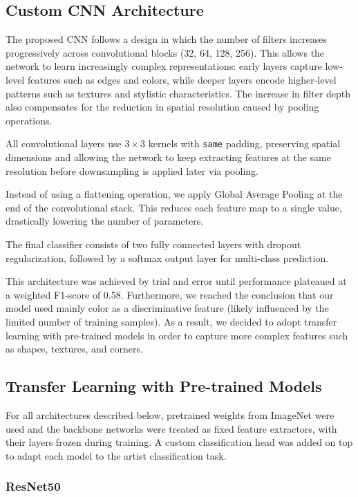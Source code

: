 \documentclass[12pt,a4paper]{article}
\begin{document}
\subsection{Custom CNN Architecture}

The proposed CNN follows a design in which the number of filters increases progressively across convolutional blocks (32, 64, 128, 256). 
This allows the network to learn increasingly complex representations: early layers capture low-level features such as edges and colors, while deeper layers encode higher-level patterns such as textures and stylistic characteristics.
The increase in filter depth also compensates for the reduction in spatial resolution caused by pooling operations.

All convolutional layers use $3 \times 3$ kernels with \texttt{same} padding, preserving spatial dimensions and allowing the network to keep extracting features at the same resolution before downsampling is applied later via pooling.

Instead of using a flattening operation, we apply Global Average Pooling at the end of the convolutional stack. 
This reduces each feature map to a single value, drastically lowering the number of parameters.

The final classifier consists of two fully connected layers with dropout regularization, followed by a softmax output layer for multi-class prediction.

This architecture was achieved by trial and error until performance plateaued at a weighted F1-score of 0.58. 
Furthermore, we reached the conclusion that our model used mainly color as a discriminative feature (likely influenced by the limited number of training samples).
As a result, we decided to adopt transfer learning with pre-trained models in order to capture more complex features such as shapes, textures, and corners. 


\subsection{Transfer Learning with Pre-trained Models}
For all architectures described below, pretrained weights from ImageNet were used and the backbone networks were treated as fixed feature extractors, with their layers frozen during training. 
A custom classification head was added on top to adapt each model to the artist classification task.

\subsubsection{ResNet50}
\end{document}
